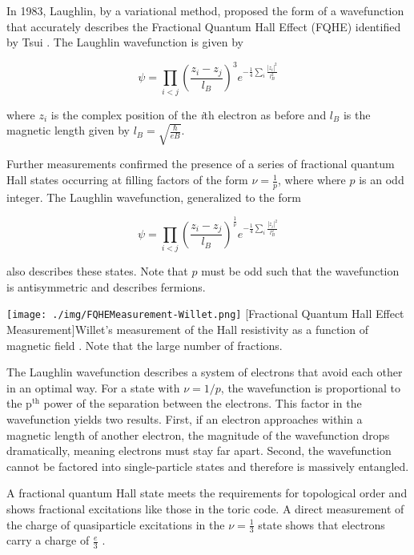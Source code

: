 In 1983, Laughlin, by a variational method, proposed the form of a wavefunction that accurately describes the Fractional Quantum Hall Effect (FQHE) identified by Tsui \cite{Laughlin1983}. The Laughlin wavefunction is given by

\begin{equation}
\psi = \prod_{i < j} \left( \frac{z_{i} - z_{j}}{l_{B}} \right)^{3} e^{-\frac{1}{4} \sum_{i} \frac{|z_{i}|^{2}}{l_{B}^{2}}}
\end{equation}

where $z_{i}$ is the complex position of the \textit{i}th electron as before and $l_{B}$ is the magnetic length given by $l_{B} = \sqrt{\frac{\hbar}{eB}}$.

Further measurements confirmed the presence of a series of fractional quantum Hall states occurring at filling factors of the form $\nu = \frac{1}{p}$, where where $p$ is an odd integer. The Laughlin wavefunction, generalized to the form

\begin{equation}
\psi = \prod_{i < j} \left( \frac{z_{i} - z_{j}}{l_{B}} \right)^{\frac{1}{\nu}} e^{-\frac{1}{4} \sum_{i} \frac{|z_{i}|^{2}}{l_{B}^{2}}}
\end{equation}

also describes these states. Note that $p$ must be odd such that the wavefunction is antisymmetric and describes fermions.

\begin{centering}
\texttt{[image: ./img/FQHEMeasurement-Willet.png]}
  \captionsetup{width=0.75\textwidth}
  [Fractional Quantum Hall Effect Measurement]{Willet's measurement of the Hall resistivity as a function of magnetic field \cite{Willet1987}. Note that the large number of fractions.}
  \label{fig:FQHE1}
\end{centering}

The Laughlin wavefunction describes a system of electrons that avoid each other in an optimal way. For a state with $\nu = 1/p$, the wavefunction is proportional to the p$^{\text{th}}$ power of the separation between the electrons. This factor in the wavefunction yields two results. First, if an electron approaches within a magnetic length of another electron, the magnitude of the wavefunction drops dramatically, meaning electrons must stay far apart. Second, the wavefunction cannot be factored into single-particle states and therefore is massively entangled.

A fractional quantum Hall state meets the requirements for topological order and shows fractional excitations like those in the toric code. A direct measurement of the charge of quasiparticle excitations in the $\nu=\frac{1}{3}$ state shows that electrons carry a charge of $\frac{e}{3}$ \cite{Goldman1995}.

